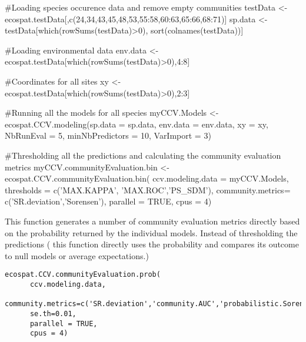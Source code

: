 \documentclass[a4paper]{book}
\begin{document}
\begin{Examples}
\begin{ExampleCode}
#Loading species occurence data and remove empty communities
testData <- ecospat.testData[,c(24,34,43,45,48,53,55:58,60:63,65:66,68:71)]
sp.data <- testData[which(rowSums(testData)>0), sort(colnames(testData))]

#Loading environmental data
env.data <- ecospat.testData[which(rowSums(testData)>0),4:8]

#Coordinates for all sites
xy <- ecospat.testData[which(rowSums(testData)>0),2:3]

#Running all the models for all species
myCCV.Models <- ecospat.CCV.modeling(sp.data = sp.data,
                                     env.data = env.data,
                                     xy = xy,
                                     NbRunEval = 5,
                                     minNbPredictors = 10,
                                     VarImport = 3)
                                     
#Thresholding all the predictions and calculating the community evaluation metrics
myCCV.communityEvaluation.bin <- ecospat.CCV.communityEvaluation.bin(
      ccv.modeling.data = myCCV.Models, 
      thresholds = c('MAX.KAPPA', 'MAX.ROC','PS_SDM'),
      community.metrics= c('SR.deviation','Sorensen'),
      parallel = TRUE,
      cpus = 4)
\end{ExampleCode}
\end{Examples}
%
\begin{Description}\relax
This function generates a number of community evaluation metrics directly based on the probability returned by the individual models. Instead of thresholding the predictions ( this function directly uses the probability and compares its outcome to null models or average expectations.)
\end{Description}
%
\begin{Usage}
\begin{verbatim}
ecospat.CCV.communityEvaluation.prob(
      ccv.modeling.data,
      community.metrics=c('SR.deviation','community.AUC','probabilistic.Sorensen'),
      se.th=0.01,
      parallel = TRUE,
      cpus = 4)
\end{verbatim}
\end{Usage}
\end{document}
